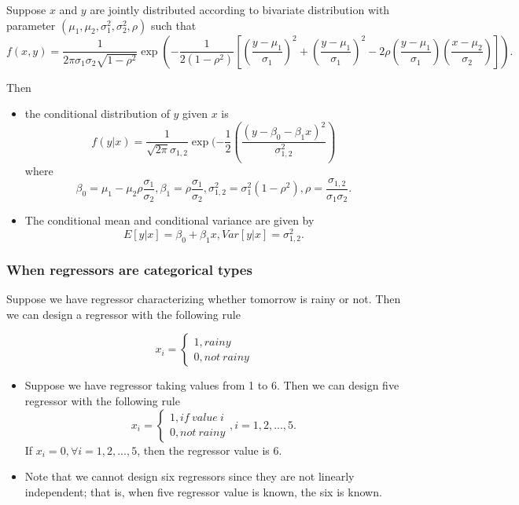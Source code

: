 \begin{refsection}
\begin{corollary}\cite[49]{montgomery2012introduction}
	Suppose $x$ and $y$ are jointly distributed	according to bivariate distribution with parameter $(\mu_1,\mu_2,\sigma^2_1,\sigma_2^2,\rho)$ such that
	$$f(x,y) = \frac{1}{2\pi \sigma_1\sigma_2 \sqrt{1-\rho^2}}\exp(-\frac{1}{2(1-\rho^2)}[(\frac{y-\mu_1}{\sigma_1})^2 + (\frac{y-\mu_1}{\sigma_1})^2 - 2\rho(\frac{y-\mu_1}{\sigma_1})(\frac{x-\mu_2}{\sigma_2})]). $$
	
	Then 
	\begin{itemize}
		\item the conditional distribution of $y$ given $x$ is	
		$$f(y|x) = \frac{1}{\sqrt{2\pi}\sigma_{1,2}}\exp(-\frac{1}{2}(\frac{(y-\beta_0-\beta_1x)^2}{\sigma_{1,2}^2})$$
		where
		$$\beta_0=\mu_1 - \mu_2\rho\frac{\sigma_1}{\sigma_2},\beta_1 = \rho\frac{\sigma_1}{\sigma_2}, \sigma_{1,2}^2=\sigma_1^2(1-\rho^2),\rho = \frac{\sigma_{1,2}}{\sigma_1\sigma_2}.$$
		\item The conditional mean and conditional variance are given by
		$$E[y|x] = \beta_0 + \beta_1x, Var[y|x]=\sigma_{1,2}^2.$$	
	\end{itemize}
\end{corollary}


\subsubsection{When regressors are categorical types}

\begin{note}
	Suppose we have regressor characterizing whether tomorrow is rainy or not. Then we can design a regressor with the following rule
	
	$$x_i = \begin{cases*}
	1, rainy\\
	0, not~rainy
	\end{cases*}$$	
\end{note}


\begin{note}
\begin{itemize}
	\item 	Suppose we have regressor taking values from 1 to 6. Then we can design five regressor with the following rule
	$$x_i = \begin{cases*}
	1, if~value~i\\
	0, not~rainy
	\end{cases*}, i=1,2,...,5.$$
	If $x_i=0,\forall i=1,2,...,5$, then the regressor value is 6.
	\item Note that we cannot design six regressors since they are not linearly independent; that is, when five regressor value is known, the six is known.
\end{itemize}	
	

\end{note}
\end{refsection}
